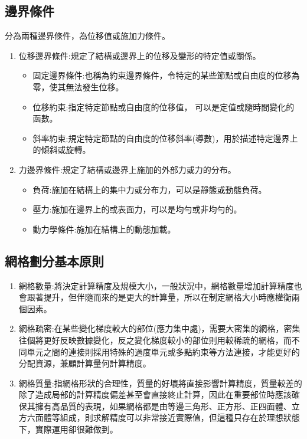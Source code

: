 \subsection{邊界條件}
分為兩種邊界條件，為位移值或施加力條件。

\begin{enumerate}
\item 位移邊界條件:規定了結構或邊界上的位移及變形的特定值或關係。

\begin{itemize}
\item 固定邊界條件:也稱為約束邊界條件，令特定的某些節點或自由度的位移為零，使其無法發生位移。
\item 位移約束:指定特定節點或自由度的位移值， 可以是定值或隨時間變化的函數。
\item 斜率約束:規定特定節點的自由度的位移斜率(導數)，用於描述特定邊界上的傾斜或旋轉。
\end{itemize}

\item 力邊界條件:規定了結構或邊界上施加的外部力或力的分布。

\begin{itemize}
\item 負荷:施加在結構上的集中力或分布力，可以是靜態或動態負荷。
\item 壓力:施加在邊界上的或表面力，可以是均勻或非均勻的。
\item 動力學條件:施加在結構上的動態加載。\\
\end{itemize}
\end{enumerate}

\subsection{網格劃分基本原則}

\begin{enumerate}
\item 網格數量:將決定計算精度及規模大小，一般狀況中，網格數量增加計算精度也會跟著提升，但伴隨而來的是更大的計算量，所以在制定網格大小時應權衡兩個因素。
\item 網格疏密:在某些變化梯度較大的部位(應力集中處)，需要大密集的網格，密集往個將更好反映數據變化，反之變化梯度較小的部位則用較稀疏的網格，而不同單元之間的連接則採用特殊的過度單元或多點約束等方法連接，才能更好的分配資源，兼顧計算量何計算精度。
\item 網格質量:指網格形狀的合理性，質量的好壞將直接影響計算精度，質量較差的除了造成局部的計算精度偏差甚至會直接終止計算，因此在重要部位時應該確保其擁有高品質的表現，如果網格都是由等邊三角形、正方形、正四面體、立方六面體等組成，則求解精度可以非常接近實際值，但這種只存在於理想狀態下，實際運用卻很難做到。\\
\end{enumerate}

